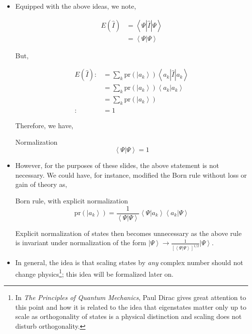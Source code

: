 \documentclass[9pt,handout]{beamer}
\newcommand{\pr}[0]{\text{pr}}
\begin{document}
\begin{frame}{}
\begin{itemize}
\item Equipped with the above ideas, we note,

\begin{align*}
E \left( \widehat{I} \right) & = \left\langle \Psi \left\lvert \widehat{I} \right\rvert \Psi \right\rangle \\
& = \left\langle \Psi \left\lvert \right. \Psi \right\rangle
\end{align*}

But,

\begin{align*}
E \left( \widehat{I} \right) : & = \sum_{k} \pr \left( \left\lvert a_k \right\rangle \right) \left\langle a_k \left\lvert \widehat{I} \right\rvert a_k \right\rangle \\
& = \sum_k \pr \left( \left\lvert a_k \right\rangle \right) \left\langle a_k \left. \right\rvert a_k \right\rangle \\
& = \sum_k \pr \left( \left\lvert a_k \right\rangle \right) \\
: & = 1
\end{align*}

Therefore, we have,

\begin{block}{Normalization}
$$\left\langle \Psi \left\lvert \right. \Psi \right\rangle = 1$$
\end{block}
\end{itemize}
\end{frame}

\begin{frame}{}
\begin{itemize}
\item However, for the purposes of these slides, the above statement is not necessary. We could have, for instance, modified the Born rule without loss or gain of theory as,

\begin{block}{Born rule, with explicit normalization}
$$\pr \left( \left\lvert a_k \right\rangle \right) = \frac{1}{\left\langle \Psi \left\lvert \right. \Psi \right\rangle} \left\langle \Psi \right. \left\lvert a_k \right\rangle \left\langle a_k \right. \left\lvert \Psi \right\rangle$$
\end{block}

Explicit normalization of states then becomes unnecessary as the above rule is invariant under normalization of the form $\displaystyle{\left\lvert \Psi \right\rangle \to \frac{1}{\left[ \left\langle \Psi \left\lvert \right. \Psi \right\rangle \right]^{1/2}} \left\lvert \Psi \right\rangle}$.

\item In general, the idea is that scaling states by \emph{any} complex number should not change physics\footnote{In \emph{The Principles of Quantum Mechanics}, Paul Dirac gives great attention to this point and how it is related to the idea that eigenstates matter only up to scale as orthogonality of states is a physical distinction and scaling does not disturb orthogonality.}; this idea will be formalized later on.
\end{itemize}
\end{frame}
\end{document}
